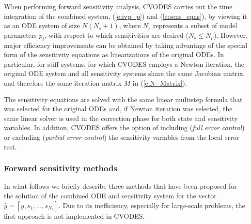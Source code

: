 When performing forward sensitivity analysis, CVODES carries out the time integration 
of the combined system, (\ref{e:ivp_p}) and (\ref{e:sens_eqns}), by viewing it as an ODE
system of size $N(N_s+1)$, where $N_s$ represents a subset of model parameters $p_i$, 
with respect to which sensitivities are desired ($N_s \le N_p$). 
However, major efficiency improvements can be obtained by taking advantage of the special 
form of the sensitivity equations as linearizations of the original ODEs. 
In particular, for stiff systems, for which CVODES employs a Newton iteration, 
the original ODE system and all sensitivity systems share the same Jacobian matrix, 
and therefore the same iteration matrix $M$ in (\ref{e:N_Matrix}).

The sensitivity equations are solved with the same linear multistep formula that
was selected for the original ODEs and, if Newton iteration was selected, the
same linear solver is used in the correction phase for both state and sensitivity 
variables. In addition, CVODES offers the option of including
({\em full error control}) or excluding
({\em partial error control}) the sensitivity variables from the local 
error test.

\subsubsection{Forward sensitivity methods}
In what follows we briefly describe three methods that have been proposed for the 
solution of the combined ODE and sensitivity system for the vector
${\hat y} = [y, s_1, \ldots , s_{N_s}]$.
Due to its inefficiency, especially for large-scale problems, the first approach 
is not implemented in CVODES.

